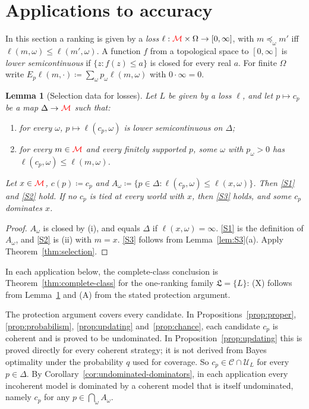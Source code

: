 \documentclass[11pt]{article}
\newcommand{\chg}[1]{{\color{red}#1}}
\newtheorem{lemma}[theorem]{Lemma}
\theoremstyle{definition}
\theoremstyle{remark}
\newcommand{\M}{\mathcal M}
\newcommand{\C}{\mathcal C}
\newcommand{\U}{\mathcal U}
\newcommand{\Lf}{\mathfrak L}
\begin{document}
\section{Applications to accuracy}\label{sec:applications}

In this section a ranking is given by a \emph{loss} $\ell:\chg{\M}\times\Omega\to[0,\infty]$, with $m\preceq_\omega m'$ iff $\ell(m,\omega)\le\ell(m',\omega)$. A function $f$ from a topological space to $[0,\infty]$ is \emph{lower semicontinuous} if $\{z:f(z)\le a\}$ is closed for every real $a$. For finite $\Omega$ write $E_p\ell(m,\cdot)\coloneqq\sum_\omega p_\omega\ell(m,\omega)$ with $0\cdot\infty=0$.

\begin{lemma}[Selection data for losses]\label{lem:loss-one-stage}
Let $L$ be given by a loss $\ell$, and let $p\mapsto c_p$ be a map $\Delta\to\chg{\M}$ such that:
\begin{enumerate}[label=(\roman*)]
\item for every $\omega$, $p\mapsto\ell(c_p,\omega)$ is lower semicontinuous on $\Delta$;
\item for every $m\in\chg{\M}$ and every finitely supported $p$, some $\omega$ with $p_\omega>0$ has $\ell(c_p,\omega)\le\ell(m,\omega)$.
\end{enumerate}
Let $x\in\chg{\M}$, $c(p)\coloneqq c_p$ and $A_\omega\coloneqq\{p\in\Delta:\ell(c_p,\omega)\le\ell(x,\omega)\}$. Then \ref{S1} and \ref{S2} hold. If no $c_p$ is tied at every world with $x$, then \ref{S3} holds, and some $c_p$ dominates $x$.
\end{lemma}
\begin{proof}
$A_\omega$ is closed by (i), and equals $\Delta$ if $\ell(x,\omega)=\infty$. \ref{S1} is the definition of $A_\omega$, and \ref{S2} is (ii) with $m=x$. \ref{S3} follows from Lemma~\ref{lem:S3}(a). Apply Theorem~\ref{thm:selection}.
\end{proof}

In each application below, the complete-class conclusion is Theorem~\ref{thm:complete-class} for the one-ranking family $\Lf=\{L\}$: (X) follows from Lemma~\ref{lem:loss-one-stage} and (A) from the stated protection argument.

The protection argument covers every candidate. In Propositions~\ref{prop:proper}, \ref{prop:probabilism}, \ref{prop:updating} and~\ref{prop:chance}, each candidate $c_p$ is coherent and is proved to be undominated. In Proposition~\ref{prop:updating} this is proved directly for every coherent strategy; it is not derived from Bayes optimality under the probability $q$ used for coverage. So $c_p\in\C\cap\U_L$ for every $p\in\Delta$. By Corollary~\ref{cor:undominated-dominators}, in each application every incoherent model is dominated by a coherent model that is itself undominated, namely $c_p$ for any $p\in\bigcap_\omega A_\omega$.
\end{document}
